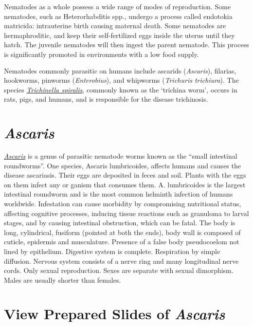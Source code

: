 Nematodes as a whole possess a wide range of modes of reproduction. Some
nematodes, such as Heterorhabditis spp., undergo a process called
endotokia matricida: intrauterine birth causing maternal death. Some
nematodes are hermaphroditic, and keep their self-fertilized eggs inside
the uterus until they hatch. The juvenile nematodes will then ingest the
parent nematode. This process is significantly promoted in environments
with a low food supply.

Nematodes commonly parasitic on humans include ascarids
(\emph{Ascaris}), filarias, hookworms, pinworms (\emph{Enterobius}), and
whipworms (\emph{Trichuris trichiura}). The species
\href{https://en.wikipedia.org/wiki/Trichinella_spiralis}{\emph{Trichinella
spiralis}}, commonly known as the `trichina worm', occurs in rats, pigs,
and humans, and is responsible for the disease trichinosis.

\section{\texorpdfstring{\emph{Ascaris}}{Ascaris}}\label{ascaris}

\href{https://en.wikipedia.org/wiki/Ascaris}{\emph{Ascaris}} is a genus
of parasitic nematode worms known as the ``small intestinal
roundworms''. One species, Ascaris lumbricoides, affects humans and
causes the disease ascariasis. Their eggs are deposited in feces and
soil. Plants with the eggs on them infect any or ganism that consumes
them. A. lumbricoides is the largest intestinal roundworm and is the
most common helminth infection of humans worldwide. Infestation can
cause morbidity by compromising nutritional status, affecting cognitive
processes, inducing tissue reactions such as granuloma to larval stages,
and by causing intestinal obstruction, which can be fatal. The body is
long, cylindrical, fusiform (pointed at both the ends), body wall is
composed of cuticle, epidermis and musculature. Presence of a false body
pseudocoelom not lined by epithelium. Digestive system is complete.
Respiration by simple diffusion. Nervous system consists of a nerve ring
and many longitudinal nerve cords. Only sexual reproduction. Sexes are
separate with sexual dimorphism. Males are usually shorter than females.

\section{\texorpdfstring{View Prepared Slides of
\emph{Ascaris}}{View Prepared Slides of Ascaris}}\label{view-prepared-slides-of-ascaris}

